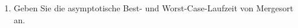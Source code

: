 \documentclass{lehramt-informatik-aufgabe}
\begin{document}
\begin{enumerate}
\begin{enumerate}












\end{enumerate}


\item Geben Sie die asymptotische Best- und Worst-Case-Laufzeit von Mergesort an.

\end{enumerate}
\end{document}
